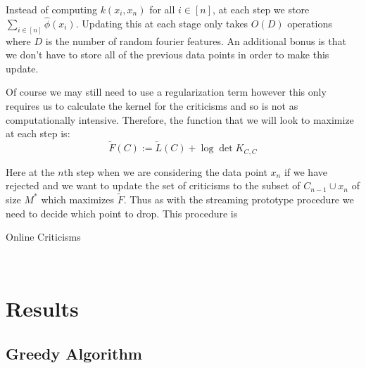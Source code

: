 \documentclass{article}
\begin{document}
	Instead of computing $k(x_i, x_n)$ for all $i \in \left[ n \right]$, at each step we store $\sum_{i \in \left[ n \right]}\hat{\phi}(x_i)$. Updating this at each stage only takes $O(D)$ operations where $D$ is the number of random fourier features. An additional bonus is that we don't have to store all of the previous data points in order to make this update.
	
	Of course we may still need to use a regularization term however this only requires us to calculate the kernel for the criticisms and so is not as computationally intensive. Therefore, the function that we will  look to maximize at each step is:
	\begin{equation}
	\tilde{F}(C) := \tilde{L}(C) + \log \det K_{C,C}
	\end{equation}
	
	Here at the $n$th step when we are considering the data point $x_n$ if we have rejected and we want to update the set of criticisms to the subset of $C_{n-1} \cup x_n$ of size $M^*$ which maximizes $\tilde{F}$. Thus as with the streaming prototype procedure we need to decide which point to drop. This procedure is 
	
	\begin{algorithm}
		\caption{Online Criticisms}\label{greedy}
		\begin{algorithmic}[1]
			\\
		\end{algorithmic}
	\end{algorithm}
	
	\section{Results}
	
	\subsection{Greedy Algorithm}
\end{document}
